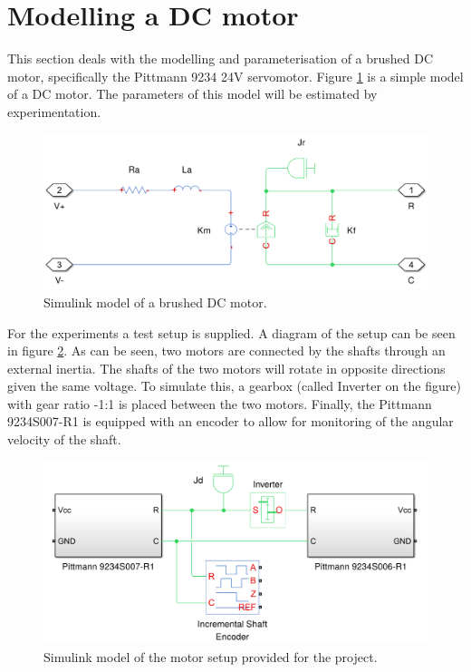 \section{Modelling a DC motor}
This section deals with the modelling and parameterisation of a brushed DC motor, specifically the Pittmann 9234 24V servomotor.
Figure \ref{fig:dcmotormodel} is a simple model of a DC motor.
The parameters of this model will be estimated by experimentation.

\begin{figure}[!h]
	\centering
	\includegraphics[width=.75\linewidth]{graphics/dcmotormodel.png}
	\caption{Simulink model of a brushed DC motor.}
	\label{fig:dcmotormodel}
\end{figure}

For the experiments a test setup is supplied. 
A diagram of the setup can be seen in figure \ref{fig:motorsetup}. 
As can be seen, two motors are connected by the shafts through an external inertia.
The shafts of the two motors will rotate in opposite directions given the same voltage.
To simulate this, a gearbox (called Inverter on the figure) with gear ratio -1:1 is placed between the two motors.
Finally, the Pittmann 9234S007-R1 is equipped with an encoder to allow for monitoring of the angular velocity of the shaft.


\begin{figure}[!h]
	\centering
	\includegraphics[width=.8\linewidth]{graphics/motorsetup.png}
	\caption{Simulink model of the motor setup provided for the project.}
	\label{fig:motorsetup}
\end{figure}

